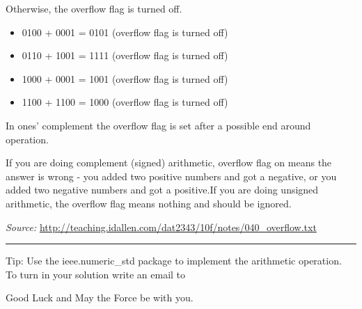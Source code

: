 \documentclass[a4paper,12pt]{article}
\begin{document}
Otherwise, the overflow flag is turned off.
\begin{itemize}
\item 0100 + 0001 = 0101 (overflow flag is turned off)
\item 0110 + 1001 = 1111 (overflow flag is turned off)
\item 1000 + 0001 = 1001 (overflow flag is turned off)
\item 1100 + 1100 = 1000 (overflow flag is turned off)
\end{itemize}

In ones' complement the overflow flag is set after a possible end around operation.

If you are doing complement (signed) arithmetic, overflow flag on
means the answer is wrong - you added two positive numbers and got a
negative, or you added two negative numbers and got a positive.If you are doing unsigned arithmetic, the overflow flag means nothing
and should be ignored.

\vspace{0.5cm}
\textit{Source: }\url{http://teaching.idallen.com/dat2343/10f/notes/040_overflow.txt}
\\
\rule{16cm}{0.4pt}

\vspace{0.3cm}

Tip: Use the ieee.numeric\_std package to implement the arithmetic operation.
\\

To turn in your solution write an email to %

\vspace{0.7cm}
Good Luck and May the Force be with you.
\end{document}
